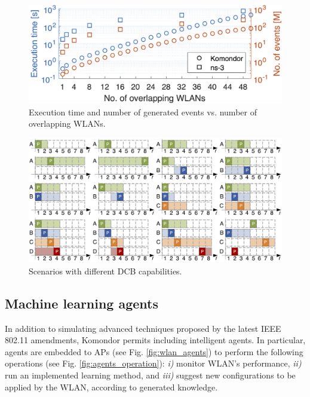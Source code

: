 \documentclass{article}
\begin{document}
	\begin{figure}[t]
		\centering	
		\includegraphics[width=.8\columnwidth]{results_scenario_3_perf.png}
		\caption{Execution time and number of generated events vs. number of overlapping WLANs.}
		\label{fig:results_high_density_scenarios_time}
	\end{figure}
	
	\begin{figure}[h]
		\centering	
		\includegraphics[width=0.9\columnwidth]{channel_allocation.png}
		\caption{Scenarios with different DCB capabilities.} %
		\label{fig:channel_allocation}
	\end{figure}
	
	\subsection{Machine learning agents}
	\label{section:machine_learning}
	
	In addition to simulating advanced techniques proposed by the latest IEEE 802.11 amendments, Komondor permits including intelligent agents. In particular, agents are embedded to APs (see Fig. \ref{fig:wlan_agents}) to perform the following operations (see Fig. \ref{fig:agents_operation}): \emph{i)} monitor WLAN's performance, \emph{ii)} run an implemented learning method, and \emph{iii)} suggest new configurations to be applied by the WLAN, according to generated knowledge.
	
\end{document}
